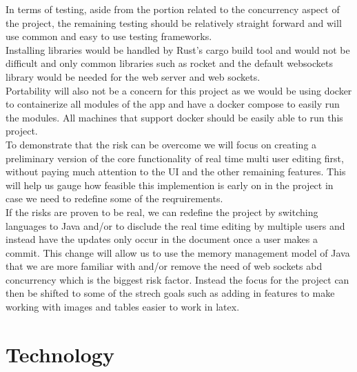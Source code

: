 \documentclass{article}
\begin{document}
In terms of testing, aside from the portion related to the concurrency aspect of the project, the remaining testing should be relatively straight forward and will use common and easy to use testing frameworks.\\

Installing libraries would be handled by Rust's cargo build tool and would not be difficult and only common libraries such as rocket and the default websockets library would be needed for the web server and web sockets.\\

Portability will also not be a concern for this project as we would be using docker to containerize all modules of the app and have a docker compose to easily run the modules. All machines that support docker should be easily able to run this
project.\\

To demonstrate that the risk can be overcome we will focus on creating a preliminary version of the core functionality of real time multi user editing first, without paying much attention to the UI and the other remaining features. This will
help us gauge how feasible this implemention is early on in the project in case we need to redefine some of the reqruirements.\\

If the risks are proven to be real, we can redefine the project by switching languages to Java and/or to disclude the real time editing by multiple users and instead have the updates only occur in the document once a user makes a commit. 
This change will allow us to use the memory management model of Java that we are more familiar with and/or remove the need of web sockets abd concurrency which is the biggest risk factor. Instead the focus for the project can then be 
shifted to some of the strech goals such as adding in features to make working with images and tables easier to work in latex.

\section{Technology}
\end{document}

